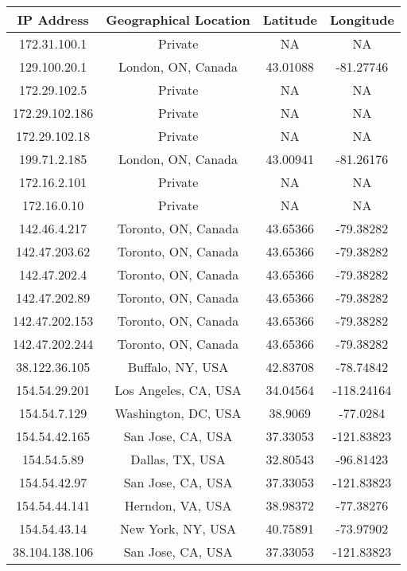 \documentclass[12pt,letterpaper]{article}
\begin{document}
\begin{tabular}{ |c|c|c|c| }
	\hline
	\textbf{IP Address} & \textbf{Geographical Location} & \textbf{Latitude} & \textbf{Longitude}\\
	\hline 
 	172.31.100.1 & Private& NA & NA \\ 
 	\hline 
 	129.100.20.1 & London, ON, Canada & 43.01088 & -81.27746 \\ 
 	\hline 
 	172.29.102.5 & Private & NA & NA \\ 
 	\hline 
 	172.29.102.186 & Private & NA & NA \\ 
 	\hline 
 	172.29.102.18 & Private & NA & NA \\ 
 	\hline 
 	199.71.2.185 & London, ON, Canada & 43.00941 & -81.26176 \\ 
 	\hline 
 	172.16.2.101 & Private & NA & NA \\ 
 	\hline 
 	172.16.0.10 & Private & NA & NA \\ 
 	\hline 
 	142.46.4.217 & Toronto, ON, Canada & 43.65366 & -79.38282 \\ 
 	\hline 
 	142.47.203.62 & Toronto, ON, Canada & 43.65366 & -79.38282 \\ 
 	\hline 
 	142.47.202.4 & Toronto, ON, Canada & 43.65366 & -79.38282 \\ 
 	\hline 
 	142.47.202.89 & Toronto, ON, Canada & 43.65366 & -79.38282 \\ 
 	\hline 
 	142.47.202.153 & Toronto, ON, Canada & 43.65366 & -79.38282 \\ 
 	\hline 
 	142.47.202.244 & Toronto, ON, Canada & 43.65366 & -79.38282 \\ 
 	\hline 
 	38.122.36.105 & Buffalo, NY, USA & 42.83708 & -78.74842 \\ 
 	\hline 
 	154.54.29.201 & Los Angeles, CA, USA & 34.04564 & -118.24164 \\ 
 	\hline 
 	154.54.7.129 & Washington, DC, USA & 38.9069 & -77.0284 \\ 
 	\hline 
 	154.54.42.165 & San Jose, CA, USA & 37.33053 & -121.83823 \\ 
 	\hline 
 	154.54.5.89 & Dallas, TX, USA & 32.80543 & -96.81423 \\ 
 	\hline 
 	154.54.42.97 & San Jose, CA, USA & 37.33053 & -121.83823 \\ 
 	\hline 
 	154.54.44.141 & Herndon, VA, USA & 38.98372 & -77.38276 \\ 
 	\hline 
 	154.54.43.14 & New York, NY, USA & 40.75891 & -73.97902 \\ 
 	\hline 
 	38.104.138.106 & San Jose, CA, USA & 37.33053 & -121.83823 \\ 

\end{tabular}
\end{document}
